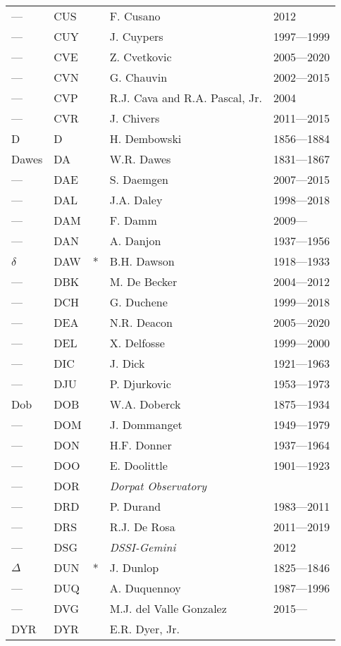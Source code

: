 \begin{longtable}{l|l|c|p{59mm}|l}
--- & CUS &   & F. Cusano & 2012 \\
--- & CUY &   & J. Cuypers & 1997---1999 \\
--- & CVE &   & Z. Cvetkovic & 2005---2020 \\
--- & CVN &   & G. Chauvin & 2002---2015 \\
--- & CVP &   & R.J. Cava and R.A. Pascal, Jr. & 2004 \\
--- & CVR &   & J. Chivers & 2011---2015 \\\midrule
D   & D   &   & H. Dembowski & 1856---1884 \\
Dawes & DA  &   & W.R. Dawes & 1831---1867 \\
--- & DAE &   & S. Daemgen & 2007---2015 \\
--- & DAL &   & J.A. Daley & 1998---2018 \\
--- & DAM &   & F. Damm & 2009--- \\
--- & DAN &   & A. Danjon & 1937---1956 \\
$\delta$ & DAW & * & B.H. Dawson &1918---1933 \\
--- & DBK &   & M. De Becker & 2004---2012 \\
--- & DCH &   & G. Duchene & 1999---2018 \\
--- & DEA &   & N.R. Deacon & 2005---2020 \\
--- & DEL &   & X. Delfosse & 1999---2000 \\
--- & DIC &   & J. Dick & 1921---1963 \\
--- & DJU &   & P. Djurkovic & 1953---1973 \\
Dob & DOB &   & W.A. Doberck & 1875---1934 \\
--- & DOM &   & J. Dommanget & 1949---1979 \\
--- & DON &   & H.F. Donner & 1937---1964 \\
--- & DOO &   & E. Doolittle & 1901---1923 \\
--- & DOR &   & \emph{Dorpat Observatory} & \\
--- & DRD &   & P. Durand & 1983---2011 \\
--- & DRS &   & R.J. De Rosa & 2011---2019 \\
--- & DSG &   & \emph{DSSI-Gemini} & 2012 \\
$\Delta$ & DUN & * & J. Dunlop & 1825---1846 \\
--- & DUQ &   & A. Duquennoy & 1987---1996 \\
--- & DVG &   & M.J. del Valle Gonzalez & 2015--- \\
DYR & DYR &   & E.R. Dyer, Jr. & \\\midrule

\end{longtable}
